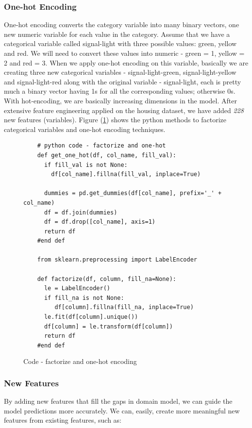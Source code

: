 \documentclass[sigconf]{acmart}
\begin{document}
	\subsubsection{One-hot Encoding}
	 One-hot encoding converts the category variable into many binary vectors, one new numeric variable for each value in the category. Assume that we have a categorical variable called signal-light with three possible values: green, yellow and red. We will need to convert these values into numeric - green = 1, yellow = 2 and red = 3. When we apply one-hot encoding on this variable, basically we are creating three new categorical variables - signal-light-green, signal-light-yellow and signal-light-red along with the original variable - signal-light, each is pretty much a binary vector having 1s for all the corresponding values; otherwise 0s. With hot-encoding, we are basically increasing dimensions in the model. After extensive feature engineering applied on the housing dataset, we have added {\em 228} new features (variables). Figure (\ref{c:code-one-hot}) shows the python methods to factorize categorical variables and one-hot encoding techniques. 
	
	\begin{figure}[htb]	
	\begin{verbatim}	
	# python code - factorize and one-hot
	def get_one_hot(df, col_name, fill_val):
	  if fill_val is not None:
	    df[col_name].fillna(fill_val, inplace=True)
	
	  dummies = pd.get_dummies(df[col_name], prefix='_' + col_name)
	  df = df.join(dummies)
	  df = df.drop([col_name], axis=1)
	  return df
	#end def
	
	from sklearn.preprocessing import LabelEncoder
	
	def factorize(df, column, fill_na=None):
	  le = LabelEncoder()
	  if fill_na is not None:
	     df[column].fillna(fill_na, inplace=True)
	  le.fit(df[column].unique())
	  df[column] = le.transform(df[column])
	  return df
	#end def
	\end{verbatim}
	\caption{Code - factorize and one-hot encoding} \label{c:code-one-hot} 
	\end{figure}

	\subsubsection{New Features}
	By adding new features that fill the gaps in domain model, we can guide the model predictions more accurately. We can, easily, create more meaningful new features from existing features, such as:
	
\end{document}

